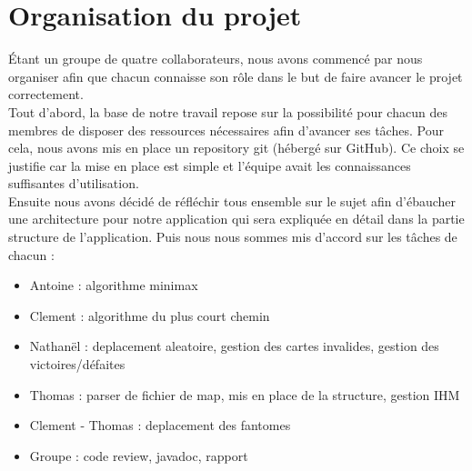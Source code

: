 \section{Organisation du projet}

Étant un groupe de quatre collaborateurs, nous avons commencé par nous organiser afin que chacun connaisse son rôle dans le but de faire avancer le projet correctement. \\
Tout d'abord, la base de notre travail repose sur la possibilité pour chacun des membres de disposer des ressources nécessaires afin d'avancer ses tâches. Pour cela, nous avons mis en place un repository git (hébergé sur GitHub). Ce choix se justifie car la mise en place est simple et l'équipe avait les connaissances suffisantes d'utilisation. \\
Ensuite nous avons décidé de réfléchir tous ensemble sur le sujet afin d'ébaucher une architecture pour notre application qui sera expliquée en détail dans la partie structure de l'application. Puis nous nous sommes mis d'accord sur les tâches de chacun :
\begin{itemize}
	\item Antoine : algorithme minimax
	\item Clement : algorithme du plus court chemin
	\item Nathanël : deplacement aleatoire, gestion des cartes invalides, gestion des victoires/défaites
	\item Thomas : parser de fichier de map, mis en place de la structure, gestion IHM
	\item Clement - Thomas : deplacement des fantomes
	\item Groupe : code review, javadoc, rapport
\end{itemize}